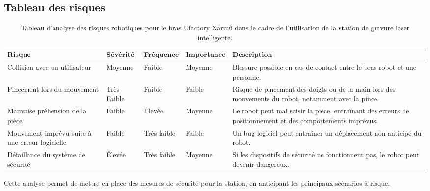 \subsection{Tableau des risques}

\begin{table}[H]
    \centering
    \renewcommand{\arraystretch}{1.4}
    \begin{tabular}{|p{3.5cm}|>{\centering\arraybackslash}m{2.2cm}|>{\centering\arraybackslash}m{2.2cm}|>{\centering\arraybackslash}m{2.2cm}|p{3.5cm}|}
        \hline
        \textbf{Risque} & \textbf{Sévérité} & \textbf{Fréquence} & \textbf{Importance} & \textbf{Description} \\
        \hline
        Collision avec un utilisateur & \cellcolor{orange!60}Moyenne & \cellcolor{yellow!60}Faible & \cellcolor{orange!60}Moyenne & Blessure possible en cas de contact entre le bras robot et une personne. \\
        \hline
        Pincement lors du mouvement & \cellcolor{green!60}Très Faible & \cellcolor{yellow!60}Faible & \cellcolor{yellow!60}Faible & Risque de pincement des doigts ou de la main lors des mouvements du robot, notamment avec la pince. \\
        \hline
        Mauvaise préhension de la pièce & \cellcolor{yellow!60}Faible & \cellcolor{red!60}Élevée & \cellcolor{orange!60}Moyenne & Le robot peut mal saisir la pièce, entraînant des erreurs de positionnement et des comportements imprévus. \\
        \hline
        Mouvement imprévu suite à une erreur logicielle & \cellcolor{yellow!60}Faible & \cellcolor{green!60}Très faible & \cellcolor{yellow!60}Faible & Un bug logiciel peut entraîner un déplacement non anticipé du robot. \\
        \hline
        Défaillance du système de sécurité & \cellcolor{red!60}Élevée & \cellcolor{green!60}Très faible & \cellcolor{orange!60}Moyenne & Si les dispositifs de sécurité ne fonctionnent pas, le robot peut devenir dangereux. \\
        \hline
    \end{tabular}
    \caption{Tableau d'analyse des risques robotiques pour le bras Ufactory Xarm6 dans le cadre de l'utilisation de la station de gravure laser intelligente.}
    \label{tab:risques_robotique}
\end{table}

Cette analyse permet de mettre en place des mesures de sécurité pour la station, en anticipant les principaux scénarios à risque.

